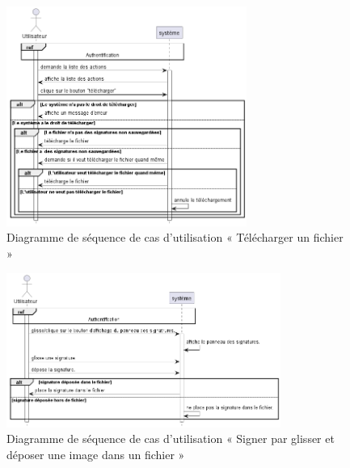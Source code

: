 \begin{figure}[H]
  \centering
  \includegraphics[width=0.7\textwidth]{out/diagrams/sprint4/download_file/download_file}
  \caption{Diagramme de séquence de cas d'utilisation « Télécharger un fichier   »}
  \label{fig:sequence_download_file}
\end{figure}
\begin{figure}[H]
  \centering
  \includegraphics[width=0.8\textwidth]{out/diagrams/sprint4/sign_by_image/sign_by_image}
  \caption{Diagramme de séquence de cas d'utilisation « Signer par glisser et déposer une image dans un fichier   »}
  \label{fig:sequence_sign_by_image}
\end{figure}

